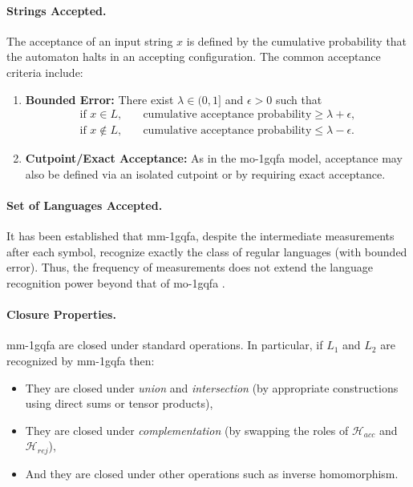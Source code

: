 \paragraph{Strings Accepted.}  
The acceptance of an input string $x$ is defined by the cumulative probability that the automaton halts in an accepting configuration. The common acceptance criteria include:
\begin{enumerate}
  \item \textbf{Bounded Error:} There exist $\lambda\in(0,1]$ and $\epsilon>0$ such that
  \[
  \begin{aligned}
  \text{if } x\in L,&\quad \text{cumulative acceptance probability} \ge \lambda+\epsilon,\\[1mm]
  \text{if } x\notin L,&\quad \text{cumulative acceptance probability} \le \lambda-\epsilon.
  \end{aligned}
  \]
  \item \textbf{Cutpoint/Exact Acceptance:} As in the \gls{mo-1gqfa} model, acceptance may also be defined via an isolated cutpoint or by requiring exact acceptance.
\end{enumerate}

\paragraph{Set of Languages Accepted.}  
It has been established that \gls{mm-1gqfa}, despite the intermediate measurements after each symbol, recognize exactly the class of regular languages (with bounded error). Thus, the frequency of measurements does not extend the language recognition power beyond that of \gls{mo-1gqfa} \cite{LI201273}.

\paragraph{Closure Properties.}  
\gls{mm-1gqfa} are closed under standard operations. In particular, if $L_1$ and $L_2$ are recognized by \gls{mm-1gqfa} then:
\begin{itemize}
  \item They are closed under \emph{union} and \emph{intersection} (by appropriate constructions using direct sums or tensor products),
  \item They are closed under \emph{complementation} (by swapping the roles of $\mathcal{H}_{acc}$ and $\mathcal{H}_{rej}$),
  \item And they are closed under other operations such as inverse homomorphism.
\end{itemize}

